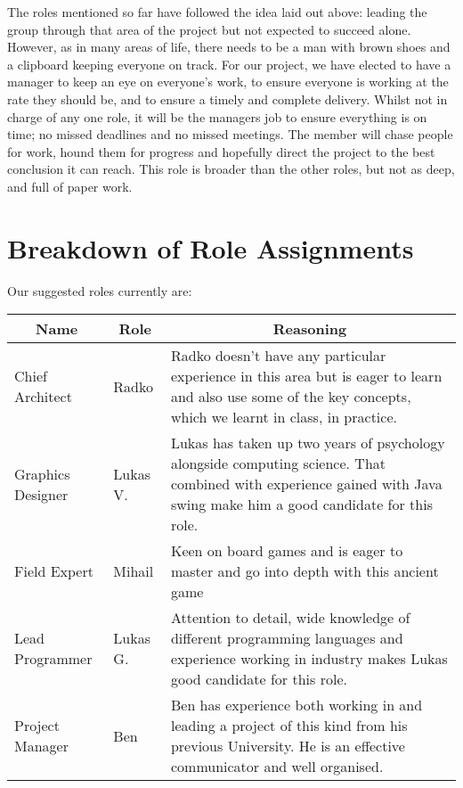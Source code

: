 \documentclass[11pt]{article}
\begin{document}
The roles mentioned so far have followed the idea laid out above: leading 
the group through that area of the project but not expected to succeed 
alone. However, as in many areas of life, there needs to be a man with 
brown shoes and a clipboard keeping everyone on track. For our project, 
we have elected to have a manager to keep an eye on everyone’s work, to 
ensure everyone is working at the rate they should be, and to ensure a 
timely and complete delivery. Whilst not in charge of any one role, it 
will be the managers job to ensure everything is on time; no missed 
deadlines and no missed meetings. The member will chase people for work, 
hound them for progress and hopefully direct the project to the best 
conclusion it can reach. This role is broader than the other roles, but 
not as deep, and full of paper work.

\section{Breakdown of Role Assignments}
Our suggested roles currently are:\\

\begin{tabular}{|l|l|l|}
  \hline
  \multicolumn{1}{|c}{\textbf{Name}} & \multicolumn{1}{|c}{\textbf{Role}} &
  \multicolumn{1}{|c|}{\textbf{Reasoning}} \\
  \hline
  Chief Architect & Radko & \parbox[t]{9.25cm}{Radko doesn't have any particular experience
  in this area but is eager to learn and also use some of the key
  concepts, which we learnt in class, in practice.} \\
  \hline
  Graphics Designer & Lukas V. & \parbox[t]{9.25cm}{Lukas has taken up two years of
  psychology alongside computing science. That combined with experience
  gained with Java swing make him a good candidate for this role.} \\
  \hline
  Field Expert & Mihail & \parbox[t]{9.25cm}{Keen on board games and is eager to master and
  go into depth with this ancient game} \\
  \hline
  Lead Programmer & Lukas G. & \parbox[t]{9.25cm}{Attention to detail, wide knowledge of
  different programming languages and experience working in industry makes Lukas good
  candidate for this role.} \\
  \hline
  Project Manager & Ben & \parbox[t]{9.25cm}{Ben has experience  both working in and
  leading a project of this kind from his previous University. He is an
  effective communicator and  well organised.}  \\
  \hline
\end{tabular}\\
\end{document}
